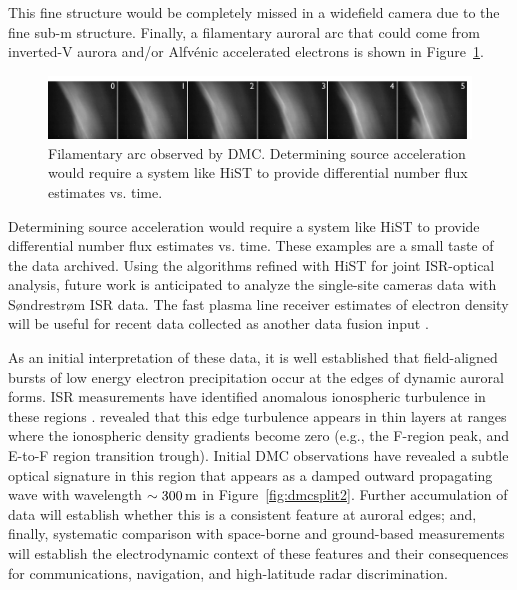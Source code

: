 This fine structure would be completely missed in a widefield camera due to the fine sub-\unit[100]{m} structure.
Finally, a filamentary auroral arc that could come from inverted-V aurora and/or Alfvénic accelerated electrons is shown in Figure~\ref{fig:dmcfil}.
\begin{figure}
	\includegraphics[width=\linewidth]{gfx/filament}
	\caption{Filamentary arc observed by DMC. Determining source acceleration would require a system like HiST to provide differential number flux estimates vs. time.}
	\label{fig:dmcfil}
\end{figure}
Determining source acceleration would require a system like HiST to provide differential number flux estimates vs. time.
These examples are a small taste of the data archived. 
Using the algorithms refined with HiST for joint ISR-optical analysis, future work is anticipated to analyze the single-site cameras data with Søndrestrøm ISR data.
The fast plasma line receiver estimates of electron density will be useful for recent data collected as another data fusion input \citep{vierinen2016}.

As an initial interpretation of these data, it is well established that field-aligned bursts of low energy electron precipitation occur at the edges of dynamic auroral forms. 
ISR measurements have identified anomalous ionospheric turbulence in these regions \citep{akbari2012}. 
\citet{akbari2013} revealed that this edge turbulence appears in thin layers at ranges where the ionospheric density gradients become zero (e.g., the F-region peak, and E-to-F region transition trough). 
Initial DMC observations have revealed a subtle optical signature in this region that appears as a damped outward propagating wave with wavelength $\sim \unit[300]{m}$ in Figure~\ref{fig:dmcsplit2}. Further accumulation of data will establish whether this is a consistent feature at auroral edges; and, finally, systematic comparison with space-borne and ground-based measurements will establish the electrodynamic context of these features and their consequences for communications, navigation, and high-latitude radar discrimination.



\FloatBarrier
